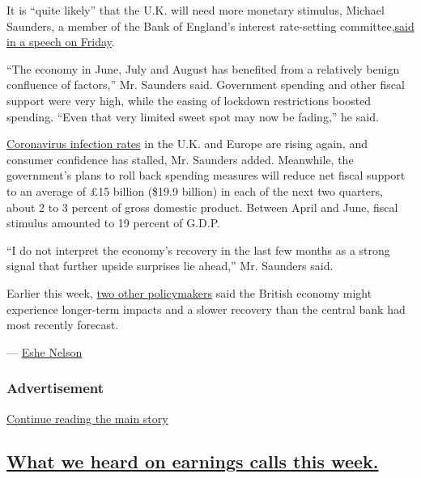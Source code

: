It is ``quite likely'' that the U.K. will need more monetary stimulus,
Michael Saunders, a member of the Bank of England's interest
rate-setting
committee,\href{https://www.bankofengland.co.uk/speech/2020/michael-saunders-speech-the-economy-and-covid-19-looking-back-and-looking-forward}{said
in a speech on Friday}.

``The economy in June, July and August has benefited from a relatively
benign confluence of factors,'' Mr. Saunders said. Government spending
and other fiscal support were very high, while the easing of lockdown
restrictions boosted spending. ``Even that very limited sweet spot may
now be fading,'' he said.

\href{https://www.nytimes3xbfgragh.onion/2020/08/21/world/europe/coronavirus-second-wave.html}{Coronavirus
infection rates} in the U.K. and Europe are rising again, and consumer
confidence has stalled, Mr. Saunders added. Meanwhile, the government's
plans to roll back spending measures will reduce net fiscal support to
an average of £15 billion (\$19.9 billion) in each of the next two
quarters, about 2 to 3 percent of gross domestic product. Between April
and June, fiscal stimulus amounted to 19 percent of G.D.P.

``I do not interpret the economy's recovery in the last few months as a
strong signal that further upside surprises lie ahead,'' Mr. Saunders
said.

Earlier this week,
\href{https://www.nytimes3xbfgragh.onion/live/2020/09/02/business/stock-market-today-coronavirus\#bank-of-england-policymakers-warn-of-even-more-economic-damage-than-is-forecast}{two
other policymakers} said the British economy might experience
longer-term impacts and a slower recovery than the central bank had most
recently forecast.

--- \href{https://www.nytimes3xbfgragh.onion/by/eshe-nelson}{Eshe
Nelson}

\hypertarget{advertisement-2}{%
\subsubsection{Advertisement}\label{advertisement-2}}

\protect\hyperlink{after-dfp-ad-mid3}{Continue reading the main story}

\hypertarget{what-we-heard-on-earnings-calls-this-week}{%
\subsection{\texorpdfstring{\protect\hyperlink{what-we-heard-on-earnings-calls-this-week}{What
we heard on earnings calls this
week.}}{What we heard on earnings calls this week.}}\label{what-we-heard-on-earnings-calls-this-week}}

